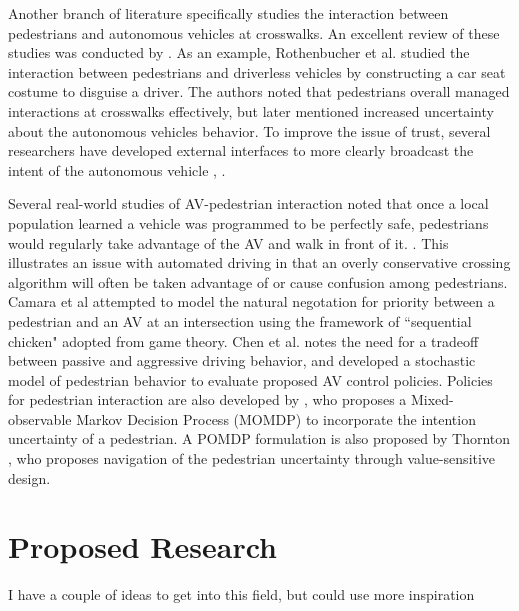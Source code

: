 \documentclass[11pt]{article}
\begin{document}
Another branch of literature specifically studies the interaction between pedestrians and autonomous vehicles at crosswalks. An excellent review of these studies was conducted by \cite{Rasouli}. As an example, Rothenbucher et al. \cite{Rothenbucher2016} studied the interaction between pedestrians and driverless vehicles by constructing a car seat costume to disguise a driver. The authors noted that pedestrians overall managed interactions at crosswalks effectively, but later mentioned increased uncertainty about the autonomous vehicles behavior. To improve the issue of trust, several researchers have developed external interfaces to more clearly broadcast the intent of the autonomous vehicle \cite{Matthews}, \cite{Lagstrom2015}. 

Several real-world studies of AV-pedestrian interaction noted that once a local population learned a vehicle was programmed to be perfectly safe, pedestrians would regularly take advantage of the AV and walk in front of it. \cite{Madigan}. This illustrates an issue with automated driving in that an overly conservative crossing algorithm will often be taken advantage of or cause confusion among pedestrians. Camara et al \cite{Camara2018} attempted to model the natural negotation for priority between a pedestrian and an AV at an intersection using the framework of ``sequential chicken" adopted from game theory. Chen et al. \cite{Chen} notes the need for a tradeoff between passive and aggressive driving behavior, and developed a stochastic model of pedestrian behavior to evaluate proposed AV control policies. Policies for pedestrian interaction are also developed by \cite{Bandyopadhyay}, who proposes a Mixed-observable Markov Decision Process (MOMDP) to incorporate the intention uncertainty of a pedestrian. A POMDP formulation is also proposed by Thornton \cite{Goldenstein2013}, who proposes navigation of the pedestrian uncertainty through value-sensitive design.    


\section{Proposed Research}

I have a couple of ideas to get into this field, but could use more inspiration
\end{document}
